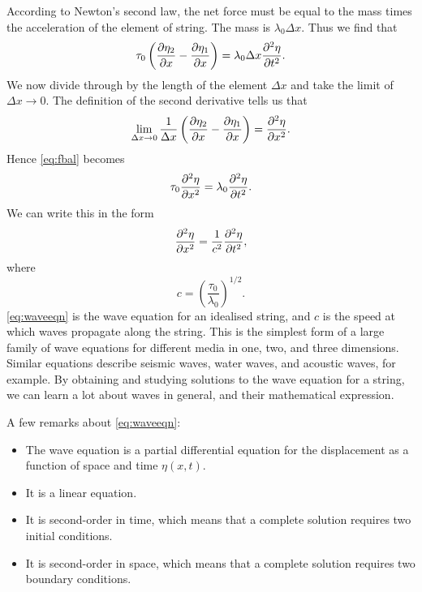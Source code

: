 \documentclass[11pt,twoside,a4paper]{article}
\begin{document}
According to Newton's second law, the net force must be equal to the
mass times the acceleration of the element of string.  The mass is
$\lambda_0\Delta x$.  Thus we find that
\begin{equation}
  \label{eq:fbal}
  \tau_0\left(\frac{\partial \eta_2}{\partial x} - \frac{\partial \eta_1}{\partial x}\right) = 
  \lambda_0\Delta x\frac{\partial^2 {\eta}}{\partial {t}^2}.
\end{equation}
We now divide through by the length of the element $\Delta x$ and take
the limit of $\Delta x\rightarrow 0$. The definition of the second
derivative tells us that
\begin{displaymath}
  \lim_{\Delta x\rightarrow 0}\frac{1}{\Delta x}\left(\frac{\partial \eta_2}{\partial x}- \frac{\partial \eta_1}{\partial x}\right) =
  \frac{\partial^2 {\eta}}{\partial {x}^2}.
\end{displaymath}
Hence \autoref{eq:fbal} becomes
\begin{displaymath}
  \tau_0\frac{\partial^2 {\eta}}{\partial {x}^2} = \lambda_0\frac{\partial^2 {\eta}}{\partial {t}^2}.
\end{displaymath}
We can write this in the form
\begin{equation}
  \label{eq:waveeqn}
  \frac{\partial^2 {\eta}}{\partial {x}^2} = \frac{1}{c^2}\frac{\partial^2 {\eta}}{\partial {t}^2},
\end{equation}
where
\begin{displaymath}
  c = \left(\frac{\tau_0}{\lambda_0}\right)^{1/2}.
\end{displaymath}
\autoref{eq:waveeqn} is the wave equation for an idealised string, and
$c$ is the speed at which waves propagate along the string.  This is
the simplest form of a large family of wave equations for different
media in one, two, and three dimensions.  Similar equations describe
seismic waves, water waves, and acoustic waves, for example.  By
obtaining and studying solutions to the wave equation for a string, we
can learn a lot about waves in general, and their mathematical
expression.

A few remarks about \autoref{eq:waveeqn}:
\begin{itemize}
\item The wave equation is a partial differential equation for the
  displacement as a function of space and time $\eta(x,t)$.
\item It is a linear equation.
\item It is second-order in time, which means that a complete solution
  requires two initial conditions.
\item It is second-order in space, which means that a complete
  solution requires two boundary conditions.
\end{itemize}
\end{document}
